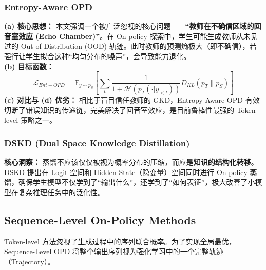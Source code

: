 \subsubsection{Entropy-Aware OPD \cite{entropyopd2026}}
\textbf{(a) 核心思想：} 本文强调一个被广泛忽视的核心问题——\textbf{“教师在不确信区域的回音室效应 (Echo Chamber)”}。在 On-policy 探索中，学生可能生成教师从未见过的 Out-of-Distribution (OOD) 轨迹。此时教师的预测熵极大（即不确信），若强行让学生拟合这种“均匀分布的噪声”，会导致能力退化。\\
\textbf{(b) 目标函数：}
\begin{equation}
    \mathcal{L}_{Ent-OPD} = \mathbb{E}_{y \sim p_S} \left[ \sum_t \frac{1}{1 + \mathcal{H}(p_T(\cdot|y_{<t}))} D_{KL}(p_T \parallel p_S) \right]
\end{equation}
\textbf{(c) 对比与 (d) 优劣：} 相比于盲目信任教师的 GKD，Entropy-Aware OPD 有效切断了错误知识的传递链，完美解决了回音室效应，是目前鲁棒性最强的 Token-level 策略之一。

\subsubsection{DSKD (Dual Space Knowledge Distillation) \cite{dskd2025}}
\textbf{核心洞察：} 蒸馏不应该仅仅被视为概率分布的压缩，而应是\textbf{知识的结构化转移}。DSKD 提出在 Logit 空间和 Hidden State（隐变量）空间同时进行 On-policy 蒸馏，确保学生模型不仅学到了“输出什么”，还学到了“如何表征”，极大改善了小模型在复杂推理任务中的泛化性。

\subsection{Sequence-Level On-Policy Methods}
\label{subsec:sequence_level}

Token-level 方法忽视了生成过程中的序列联合概率。为了实现全局最优，Sequence-Level OPD 将整个输出序列视为强化学习中的一个完整轨迹（Trajectory）。

